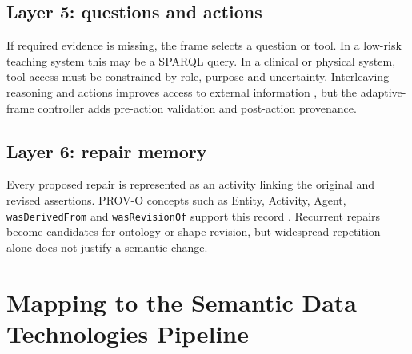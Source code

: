\documentclass[11pt,a4paper]{article}
\begin{document}
\subsection{Layer 5: questions and actions}

If required evidence is missing, the frame selects a question or tool. In a
low-risk teaching system this may be a SPARQL query. In a clinical or physical
system, tool access must be constrained by role, purpose and uncertainty.
Interleaving reasoning and actions improves access to external information
\citep{yao2023react}, but the adaptive-frame controller adds pre-action
validation and post-action provenance.

\subsection{Layer 6: repair memory}

Every proposed repair is represented as an activity linking the original and
revised assertions. PROV-O concepts such as Entity, Activity, Agent,
\texttt{wasDerivedFrom} and \texttt{wasRevisionOf} support this record
\citep{prov2013}. Recurrent repairs become candidates for ontology or shape
revision, but widespread repetition alone does not justify a semantic change.

\section{Mapping to the Semantic Data Technologies Pipeline}
\end{document}
